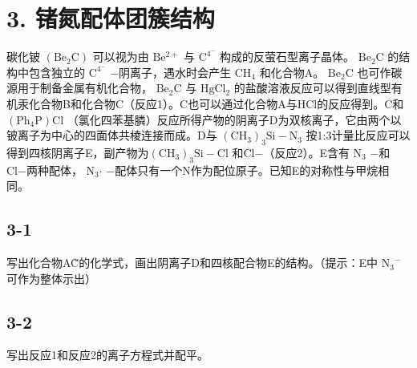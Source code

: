 \section*{3. 锗氮配体团簇结构}
碳化铍 $\mathrm { ( B e _ { 2 } C ) }$ 可以视为由 $\mathrm { B e ^ { 2 + } }$ 与 $\mathrm { C ^ { 4 ^ { - } } }$ 构成的反萤⽯型离⼦晶体。 $\mathrm { B e _ { 2 } C }$ 的结构中包含独⽴的 $\mathrm { C ^ { 4 ^ { - } } }$ −阴离⼦，遇⽔时会产⽣ $\mathrm { C H _ { 4 } }$ 和化合物A。 $\mathrm { B e _ { 2 } C }$ 也可作碳源⽤于制备⾦属有机化合物， $\mathrm { B e _ { 2 } C }$ 与 $\mathrm { H g C l _ { 2 } }$ 的盐酸溶液反应可以得到直线型有机汞化合物B和化合物C（反应1）。C也可以通过化合物A与HCl的反应得到。C和 $\mathrm { ( P h _ { 4 } P ) C l }$ （氯化四苯基膦）反应所得产物的阴离⼦D为双核离⼦，它由两个以铍离⼦为中⼼的四⾯体共棱连接⽽成。D与 $\mathrm { ( C H _ { 3 } ) _ { 3 } S i - N _ { 3 } }$ 按1:3计量⽐反应可以得到四核阴离⼦E，副产物为$\mathrm { ( C H _ { 3 } ) _ { 3 } S i - C l }$ 和Cl−（反应2）。E含有 $\mathrm { N } _ { 3 }$ −和Cl−两种配体， $\mathrm { N } _ { 3 } { \mathrm { \cdot } }$ −配体只有⼀个N作为配位原⼦。已知E的对称性与甲烷相同。

\subsection*{3-1}
写出化合物A\~C的化学式，画出阴离⼦D和四核配合物E的结构。（提⽰：E中 $\mathrm { N _ { 3 } } ^ { - }$ 可作为整体⽰出）

\subsection*{3-2}
写出反应1和反应2的离⼦⽅程式并配平。
